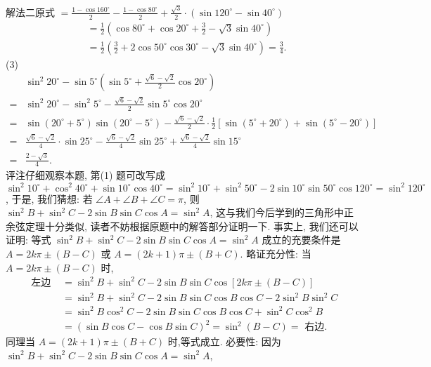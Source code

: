 解法二原式 $=\frac{1-\cos 160^{\circ}}{2}-\frac{1-\cos 80^{\circ}}{2}+\frac{\sqrt{3}}{2} \cdot\left(\sin 120^{\circ}-\sin 40^{\circ}\right)$
$$
\begin{aligned}
& =\frac{1}{2}\left(\cos 80^{\circ}+\cos 20^{\circ}+\frac{3}{2}-\sqrt{3} \sin 40^{\circ}\right) \\
& =\frac{1}{2}\left(\frac{3}{2}+2 \cos 50^{\circ} \cos 30^{\circ}-\sqrt{3} \sin 40^{\circ}\right)=\frac{3}{4} .
\end{aligned}
$$
(3)
$$
\begin{aligned}
& \sin ^2 20^{\circ}-\sin 5^{\circ}\left(\sin 5^{\circ}+\frac{\sqrt{6}-\sqrt{2}}{2} \cos 20^{\circ}\right) \\
= & \sin ^2 20^{\circ}-\sin ^2 5^{\circ}-\frac{\sqrt{6}-\sqrt{2}}{2} \sin 5^{\circ} \cos 20^{\circ} \\
= & \sin \left(20^{\circ}+5^{\circ}\right) \sin \left(20^{\circ}-5^{\circ}\right)-\frac{\sqrt{6}-\sqrt{2}}{2} \cdot \frac{1}{2}\left[\sin \left(5^{\circ}+20^{\circ}\right)+  \sin \left(5^{\circ}-20^{\circ}\right)\right] \\
= & \frac{\sqrt{6}-\sqrt{2}}{4} \cdot \sin 25^{\circ}-\frac{\sqrt{6}-\sqrt{2}}{4} \sin 25^{\circ}+\frac{\sqrt{6}-\sqrt{2}}{4} \sin 15^{\circ} \\
= & \frac{2-\sqrt{3}}{4} .
\end{aligned}
$$
评注仔细观察本题, 第(1) 题可改写成 $\sin ^2 10^{\circ}+\cos ^2 40^{\circ}+\sin 10^{\circ} \cos 40^{\circ}= \sin ^2 10^{\circ}+\sin ^2 50^{\circ}-2 \sin 10^{\circ} \sin 50^{\circ} \cos 120^{\circ}=\sin ^2 120^{\circ}$, 于是, 我们猜想: 若 $\angle A+\angle B+\angle C=\pi$, 则 $\sin ^2 B+\sin ^2 C-2 \sin B \sin C \cos A=\sin ^2 A$, 这与我们今后学到的三角形中正余弦定理十分类似, 读者不妨根据原题中的解答部分证明一下.
事实上, 我们还可以证明: 等式 $\sin ^2 B+\sin ^2 C-2 \sin B \sin C \cos A=\sin ^2 A$ 成立的充要条件是 $A=2 k \pi \pm(B-C)$ 或 $A=(2 k+1) \pi \pm(B+C)$.
略证充分性: 当 $A=2 k \pi \pm(B-C)$ 时,
$$
\begin{aligned}
\text { 左边 } & =\sin ^2 B+\sin ^2 C-2 \sin B \sin C \cos [2 k \pi \pm(B-C)] \\
& =\sin ^2 B+\sin ^2 C-2 \sin B \sin C \cos B \cos C-2 \sin ^2 B \sin ^2 C \\
& =\sin ^2 B \cos ^2 C-2 \sin B \sin C \cos B \cos C+\sin ^2 C \cos ^2 B \\
& =(\sin B \cos C-\cos B \sin C)^2=\sin ^2(B-C)=\text { 右边.
}
\end{aligned}
$$
同理当 $A=(2 k+1) \pi \pm(B+C)$ 时,等式成立.
必要性: 因为 $\sin ^2 B+\sin ^2 C-2 \sin B \sin C \cos A=\sin ^2 A$,
